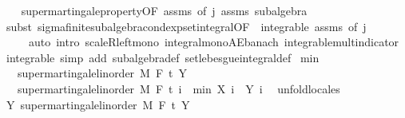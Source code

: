 \begin{isabellebody}
\ \ %
\endisadelimproof
%
\isatagproof
{}\isamarkupfalse%
\ supermartingale{\isacharunderscore}{\kern0pt}property{\isacharbrackleft}{\kern0pt}OF\ assms{\isacharparenleft}{\kern0pt}{}{\isacharparenright}{\kern0pt}{\isacharcomma}{\kern0pt}\ of\ j{\isacharbrackright}{\kern0pt}\ assms\ subalgebra\isanewline
\ \ \isamarkupfalse%
\ {\isacharparenleft}{\kern0pt}subst\ sigma{\isacharunderscore}{\kern0pt}finite{\isacharunderscore}{\kern0pt}subalgebra{\isachardot}{\kern0pt}cond{\isacharunderscore}{\kern0pt}exp{\isacharunderscore}{\kern0pt}set{\isacharunderscore}{\kern0pt}integral{\isacharbrackleft}{\kern0pt}OF\ {\isacharunderscore}{\kern0pt}\ integrable\ assms{\isacharparenleft}{\kern0pt}{}{\isacharparenright}{\kern0pt}{\isacharcomma}{\kern0pt}\ of\ j{\isacharbrackright}{\kern0pt}{\isacharparenright}{\kern0pt}\isanewline
\ \ \ \ \ {\isacharparenleft}{\kern0pt}auto\ intro{\isacharbang}{\kern0pt}{\isacharcolon}{\kern0pt}\ scaleR{\isacharunderscore}{\kern0pt}left{\isacharunderscore}{\kern0pt}mono\ integral{\isacharunderscore}{\kern0pt}mono{\isacharunderscore}{\kern0pt}AE{\isacharunderscore}{\kern0pt}banach\ integrable{\isacharunderscore}{\kern0pt}mult{\isacharunderscore}{\kern0pt}indicator\ integrable\ simp\ add{\isacharcolon}{\kern0pt}\ subalgebra{\isacharunderscore}{\kern0pt}def\ set{\isacharunderscore}{\kern0pt}lebesgue{\isacharunderscore}{\kern0pt}integral{\isacharunderscore}{\kern0pt}def{\isacharparenright}{\kern0pt}%
\endisatagproof
{\isafoldproof}%
%
\isadelimproof
\isanewline
%
\endisadelimproof
\isanewline
{}\isamarkupfalse%
\ min{\isacharcolon}{\kern0pt}\isanewline
\ \ \ {\isachardoublequoteopen}supermartingale{\isacharunderscore}{\kern0pt}linorder\ M\ F\ t\ Y{\isachardoublequoteclose}\isanewline
\ \ \ {\isachardoublequoteopen}supermartingale{\isacharunderscore}{\kern0pt}linorder\ M\ F\ t\ {\isacharparenleft}{\kern0pt}{\isasymlambda}i\ {\isasymxi}{\isachardot}{\kern0pt}\ min\ {\isacharparenleft}{\kern0pt}X\ i\ {\isasymxi}{\isacharparenright}{\kern0pt}\ {\isacharparenleft}{\kern0pt}Y\ i\ {\isasymxi}{\isacharparenright}{\kern0pt}{\isacharparenright}{\kern0pt}{\isachardoublequoteclose}\isanewline
%
\isadelimproof
%
\endisadelimproof
%
\isatagproof
{}\isamarkupfalse%
\ {\isacharparenleft}{\kern0pt}unfold{\isacharunderscore}{\kern0pt}locales{\isacharparenright}{\kern0pt}\isanewline
\ \ \isamarkupfalse%
\ Y{\isacharcolon}{\kern0pt}\ supermartingale{\isacharunderscore}{\kern0pt}linorder\ M\ F\ t\ Y\ \isamarkupfalse%

\end{isabellebody}
